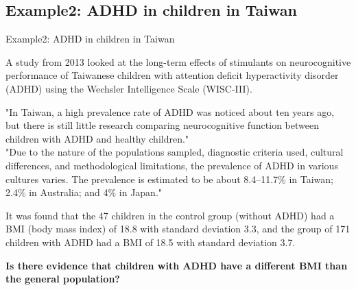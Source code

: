 \documentclass[t,xcolor=pdftex,dvipsnames,table]{beamer}
\begin{document}
\subsection[Example2]{Example2: ADHD in children in Taiwan}
\begin{frame}{Example2: ADHD in children in Taiwan}

A study from 2013 looked at the long-term effects of stimulants on neurocognitive performance of Taiwanese children with attention deficit hyperactivity disorder (ADHD) using the Wechsler Intelligence Scale (WISC-III).  

\vspace{.5cm}
"In Taiwan, a high prevalence rate of ADHD was noticed about ten years ago, but there is still little research comparing neurocognitive function between children with ADHD and healthy children."  \\
"Due to the nature of the populations sampled, diagnostic criteria used, cultural differences, and methodological limitations, the prevalence of ADHD in various cultures varies. 
The prevalence is estimated to be about 8.4–11.7\% in Taiwan; 2.4\% in Australia; and 4\% in Japan."
\end{frame}


\begin{frame}{}

It was found that the 47 children in the control group (without ADHD) had a BMI (body mass index) of 18.8 with standard deviation 3.3, and the group of 171 children with ADHD had a BMI of 18.5 with standard deviation 3.7.

\vspace{.5cm}
{\bf Is there evidence that children with ADHD have a different BMI than the general population?}

\href{http://www.ncbi.nlm.nih.gov/pmc/articles/PMC4235029/}{}
\href{http://www.ncbi.nlm.nih.gov/pmc/articles/PMC4235029/table/T1/}{}
\href{http://www.ncbi.nlm.nih.gov/pmc/articles/PMC4235029/table/T2/}{}
\href{http://www.cdc.gov/healthyweight/assessing/bmi/childrens_bmi/about_childrens_bmi.html}{}
\end{frame}
\end{document}

